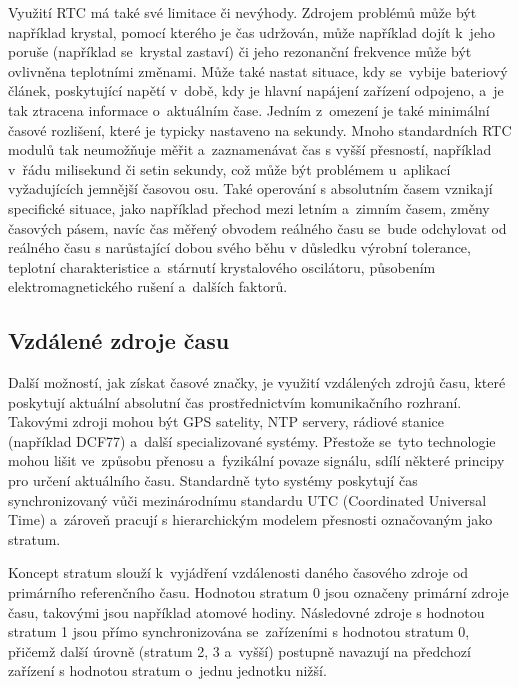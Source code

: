 Využití RTC má také své limitace či nevýhody. Zdrojem problémů může být například krystal, pomocí kterého je čas udržován, může například dojít k~jeho poruše (například se~krystal zastaví) či jeho rezonanční frekvence může být ovlivněna teplotními změnami. Může také nastat situace, kdy se~vybije bateriový článek, poskytující napětí v~době, kdy je hlavní napájení zařízení odpojeno, a~je tak ztracena informace o~aktuálním čase. Jedním z~omezení je také minimální časové rozlišení, které je typicky nastaveno na sekundy. Mnoho standardních RTC modulů tak neumožňuje měřit a~zaznamenávat čas s vyšší přesností, například v~řádu milisekund či setin sekundy, což může být problémem u~aplikací vyžadujících jemnější časovou osu. Také operování s absolutním časem vznikají specifické situace, jako například přechod mezi letním a~zimním časem, změny časových pásem, navíc čas měřený obvodem reálného času se~bude odchylovat od reálného času s narůstající dobou svého běhu v důsledku  výrobní tolerance, teplotní charakteristice a~stárnutí krystalového oscilátoru, působením elektromagnetického rušení a~dalších faktorů.~\cite{jameco_choosing_right_real_time_clock_chip_or_module, embed_journal_interfacing_rtc_with_microcontroler, medium_rtc, ti_rtc}

\subsection{Vzdálené zdroje času}
Další možností, jak získat časové značky, je využití vzdálených zdrojů času, které poskytují aktuální absolutní čas prostřednictvím komunikačního rozhraní. Takovými zdroji mohou být GPS satelity, NTP servery, rádiové stanice (například DCF77) a~další specializované systémy. Přestože se~tyto technologie mohou lišit ve~způsobu přenosu a~fyzikální povaze signálu, sdílí některé principy pro určení aktuálního času. Standardně tyto systémy poskytují čas synchronizovaný vůči mezinárodnímu standardu UTC (Coordinated Universal Time) a~zároveň pracují s hierarchickým modelem přesnosti označovaným jako stratum.~\cite{sparkfun_gps, sookocheff_ntp}

Koncept stratum slouží k~vyjádření vzdálenosti daného časového zdroje od primárního referenčního času. Hodnotou stratum 0 jsou označeny primární zdroje času, takovými jsou například atomové hodiny. Následovné zdroje s hodnotou stratum 1 jsou přímo synchronizována se~zařízeními s hodnotou stratum 0, přičemž další úrovně (stratum 2, 3 a~vyšší) postupně navazují na předchozí zařízení s hodnotou stratum o~jednu jednotku nižší.~\cite{sookocheff_ntp}

